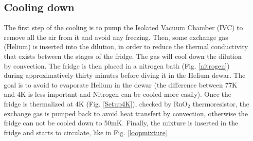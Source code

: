           
            
            \subsection{Cooling down}
            
            The first step of the cooling is to pump the Isolated Vacuum Chamber (IVC) to remove all the air from it and avoid any freezing. Then, some exchange gas (Helium) is inserted into the dilution, in order to reduce the thermal conductivity that exists between the stages of the fridge. The gas will cool down the dilution by convection. The fridge is then placed in a nitrogen bath (Fig. \ref{nitrogen}) during approximatively thirty minutes before diving it in the Helium dewar. The goal is to avoid to evaporate Helium in the dewar (the difference between 77K and 4K is less important and Nitrogen can be cooled more easily). Once the fridge is thermalized at 4K (Fig. \ref{Setup4K}), checked by RuO$_2$ thermoresistor, the exchange gas is pumped back to avoid heat transfert by convection, otherwise the fridge can not be cooled down to 50mK. Finally, the mixture is inserted in the fridge and starts to circulate, like in Fig. \ref{loopmixture}
            
